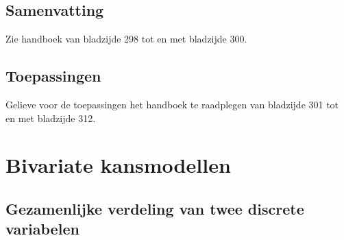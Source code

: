 \documentclass[titlepage]{article}
\numberwithin{equation}{section}
\begin{document}
\subsection{Samenvatting}
Zie handboek van bladzijde 298 tot en met bladzijde 300.
\subsection{Toepassingen}
Gelieve voor de toepassingen het handboek te raadplegen van bladzijde 301 tot en met bladzijde 312.
\section{Bivariate kansmodellen}
\subsection{Gezamenlijke verdeling van twee discrete variabelen}
\end{document}
